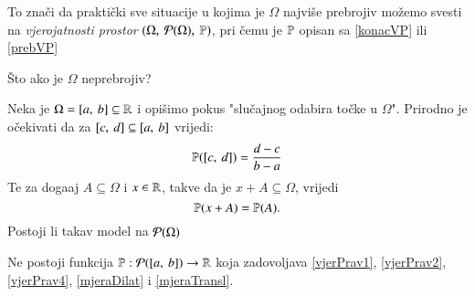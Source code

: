 To zna\v ci da prakti\v cki sve situacije u kojima je $\Omega$ najvi\v se
prebrojiv mo\v zemo svesti na \emph{vjerojatnosti prostor} $(\Omega,
\: \mathcal{P}({\Omega}), \: \mathbb{P})$, pri \v cemu je $\mathbb{P}$ opisan
sa \eqref{konacVP} ili \eqref{prebVP}

\v Sto ako je $\Omega$ neprebrojiv?

\begin{pr}
    Neka je $\Omega = [{a}, \:{b}] \subseteq \mathbb{R}$ i opi\v simo pokus
    "slu\v cajnog odabira to\v cke u $\Omega$". Prirodno je
    o\v cekivati da za $[{c}, \:{d}] \subseteq [{a}, \:{b}]$ vrijedi:
    \begin{equation} \label{mjeraDilat}
        \mathbb{P}({[{c}, \:{d}]}) = \frac{d - c}{b - a}
    \end{equation}
    Te za doga\dj aj $A \subseteq \Omega$ i $x \in \mathbb{R}$, takve da je
    $x + A \subseteq \Omega$, vrijedi
    \begin{equation} \label{mjeraTransl}
        \mathbb{P}({x + A}) = \mathbb{P}({A}).
    \end{equation}
    Postoji li takav model na $\mathcal{P}({\Omega})$
\end{pr}

\begin{tm}
    Ne postoji funkcija $\mathbb{P}: \mathcal{P}({[{a}, \:{b}]}) \to \mathbb{R}$
    koja zadovoljava \eqref{vjerPrav1}, \eqref{vjerPrav2},
    \eqref{vjerPrav4}, \eqref{mjeraDilat} i \eqref{mjeraTransl}.
\end{tm}


